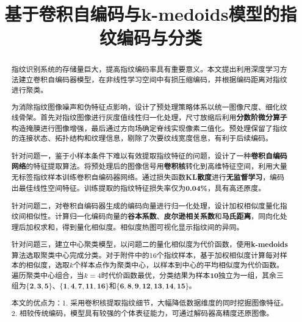 \documentclass{whutmod}
\title{基于卷积自编码与k-medoids模型的指纹编码与分类}
\begin{document}
    \maketitle
    \thispagestyle{empty}

    \begin{abstract}
        指纹识别系统的存储量巨大，提高指纹编码率具有重要意义。本文提出利用深度学习方法建立卷积自编码器模型，在非线性学习空间中有损压缩编码，并根据编码距离对指纹进行聚类。

        为消除指纹图像噪声和伪特征点影响，设计了预处理策略体系以统一图像尺度、细化纹线骨架。首先对指纹图像进行灰度值线性归一化处理，尺寸放缩后利用\textbf{分数阶微分算子}构造掩膜进行图像增强，最后通过方向场确定脊线实现像素二值化。预处理保留了指纹的连接状态、拓扑结构和纹理信息，剔除了次要纹线宽度信息，有利于后续编码。

        针对问题一，鉴于小样本条件下难以有效提取指纹特征的问题，设计了一种\textbf{卷积自编码网络}的特征提取算法。将预处理后的图像信号用\textbf{卷积核}转化到高维特征空间，利用大量无标签指纹样本训练卷积自编码器网络。通过损失函数\textbf{KL散度}进行\textbf{无监督学习}，编码出最佳线性空间特征。训练提取的指纹特征损失率仅为\textbf{0.04\%}，具有高还原度。

        针对问题二，对卷积自编码器生成的编码向量进行归一化处理，设计加权相似度量化指纹间相似性。计算归一化编码向量的\textbf{谷本系数}、\textbf{皮尔逊相关系数}和\textbf{马氏距离}，同向化处理后加权求和，得到量化相似度。相似度热图可视化显示指纹间的异同。

        针对问题三，建立中心聚类模型，以问题二的量化相似度为代价函数，使用\textbf{k-medoids}算法选取聚类中心完成分类。对于附件中的16个指纹样本，基于加权相似度计算每对样本的相似度，选取$k$个样本点作为聚类中心，以样本到中心的平均相似度为代价函数。遍历聚类中心组合，当$k=4$时代价函数最优，分类结果为样本$\bm{10}$独立为一组，其余三组为$\bm{\{2,3,5\}}$、$\bm{\{1,4,7,11,16\}}$和$\bm{\{6,8,9,12,13,14,15\}}$。

        本文的优点为：1. 采用卷积核提取指纹细节，大幅降低数据维度的同时挖掘图像特征。2. 相较传统编码，模型具有较强的个体表征能力，可通过解码器高精度还原图像。

    \end{abstract}

    \thispagestyle{empty}
    \tableofcontents
    \setcounter{page}{0}
    \newpage
\end{document}
